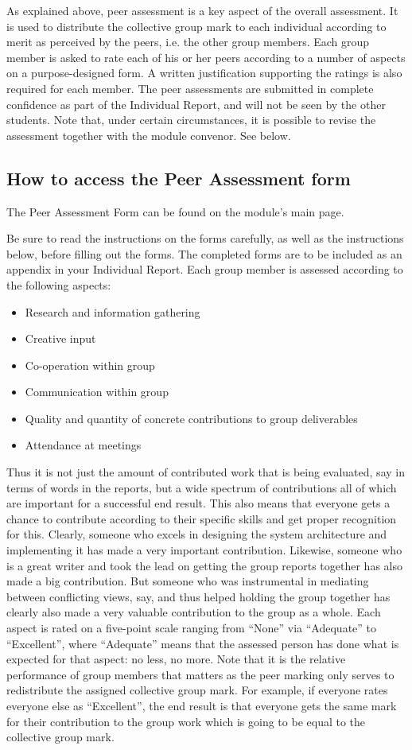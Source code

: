 As explained above, peer assessment is a key aspect of the overall assessment. It is used to distribute the collective group mark to each individual according to merit as perceived by the peers, i.e. the other group members. Each group member is asked to rate each of his or her peers according to a number of aspects on a purpose-designed form. A written justification supporting the ratings is also required for each member. The peer assessments are submitted in complete confidence as part of the Individual Report, and will not be seen by the other students. Note that, under certain circumstances, it is possible to revise the assessment together with the module convenor. See below.


\subsection{How to access the Peer Assessment form}
The Peer Assessment Form can be found on the module's main page.

Be sure to read the instructions on the forms carefully, as well as the instructions below, before filling out the forms. The completed forms are to be included as an appendix in your Individual Report.
Each group member is assessed according to the following aspects:
\begin{itemize}
    \item Research and information gathering
    \item Creative input
    \item Co-operation within group
    \item Communication within group
    \item Quality and quantity of concrete contributions to group deliverables
    \item Attendance at meetings
\end{itemize}

Thus it is not just the amount of contributed work that is being evaluated, say in terms of words in the reports, but a wide spectrum of contributions all of which are important for a successful end result. This also means that everyone gets a chance to contribute according to their specific skills and get proper recognition for this. Clearly, someone who excels in designing the system architecture and implementing it has made a very important contribution. Likewise, someone who is a great writer and took the lead on getting the group reports together has also made a big contribution. But someone who was instrumental in mediating between conflicting views, say, and thus helped holding the group together has clearly also made a very valuable contribution to the group as a whole.
Each aspect is rated on a five-point scale ranging from “None” via “Adequate” to “Excellent”, where “Adequate” means that the assessed person has done what is expected for that aspect: no less, no more. Note that it is the relative performance of group members that matters as the peer marking only serves to redistribute the assigned collective group mark. For example, if everyone rates everyone else as “Excellent”, the end result is that everyone gets the same mark for their contribution to the group work which is going to be equal to the collective group mark.


